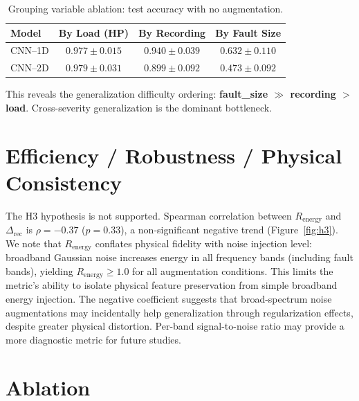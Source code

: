 ﻿\documentclass[11pt,a4paper]{article}
\begin{document}
\begin{table}[H]
\centering
\caption{Grouping variable ablation: test accuracy with no augmentation.}
\label{tab:ablation}
\begin{tabular}{lccc}
\toprule
Model & By Load (HP) & By Recording & By Fault Size \\ \midrule
CNN--1D & $0.977 \pm 0.015$ & $0.940 \pm 0.039$ & $\mathbf{0.632 \pm 0.110}$ \\
CNN--2D & $0.979 \pm 0.031$ & $0.899 \pm 0.092$ & $\mathbf{0.473 \pm 0.092}$ \\
\bottomrule
\end{tabular}
\end{table}

This reveals the generalization difficulty ordering: \textbf{fault\_size $\gg$ recording $>$ load}. Cross-severity generalization is the dominant bottleneck.

\section{Efficiency / Robustness / Physical Consistency}

The H3 hypothesis is not supported. Spearman correlation between $R_{\text{energy}}$ and $\Delta_{\text{rec}}$ is $\rho = -0.37$ ($p = 0.33$), a non-significant negative trend (Figure~\ref{fig:h3}). We note that $R_{\text{energy}}$ conflates physical fidelity with noise injection level: broadband Gaussian noise increases energy in all frequency bands (including fault bands), yielding $R_{\text{energy}}\geq1.0$ for all augmentation conditions. This limits the metric's ability to isolate physical feature preservation from simple broadband energy injection. The negative coefficient suggests that broad-spectrum noise augmentations may incidentally help generalization through regularization effects, despite greater physical distortion. Per-band signal-to-noise ratio may provide a more diagnostic metric for future studies.

\section{Ablation}
\end{document}
